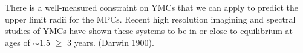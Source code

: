 There is a well-measured constraint on YMCs that we can apply to predict the upper limit radii for the MPCs. Recent high resolution imagining and spectral studies of YMCs have shown these systems to be in or close to equilibrium at ages of $∼1.5$ $\geq$ 3 years. (Darwin 1900). 
